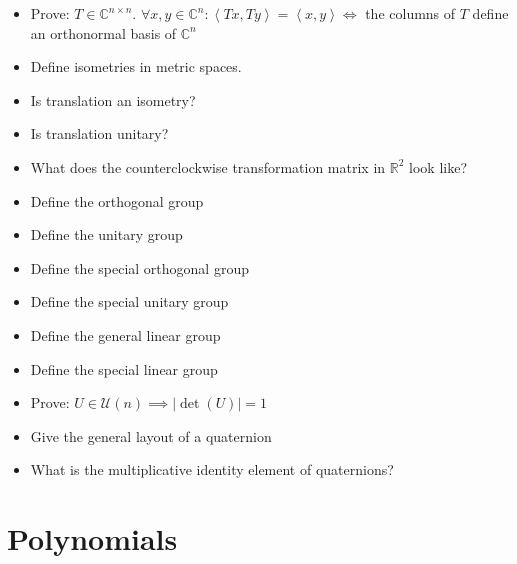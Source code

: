 \documentclass[a4paper]{article}
\newcommand{\ip}[2]{\left\langle#1,#2\right\rangle} %
\newcommand{\card}[1]{\left|#1\right|}
\begin{document}
\begin{itemize}
  \item Prove: $T \in \mathbb C^{n \times n}$. $\forall x,y \in \mathbb C^n: \ip{Tx}{Ty} = \ip xy \iff$ the columns of $T$ define an orthonormal basis of $\mathbb C^n$
  \item Define isometries in metric spaces.
  \item Is translation an isometry?
  \item Is translation unitary?
  \item What does the counterclockwise transformation matrix in $\mathbb R^2$ look like?
  \item Define the orthogonal group
  \item Define the unitary group
  \item Define the special orthogonal group
  \item Define the special unitary group
  \item Define the general linear group
  \item Define the special linear group
  \item Prove: $U \in \mathcal U(n) \implies \card{\det(U)} = 1$
  \item Give the general layout of a quaternion
  \item What is the multiplicative identity element of quaternions?
\end{itemize}

\section{Polynomials}
\end{document}
